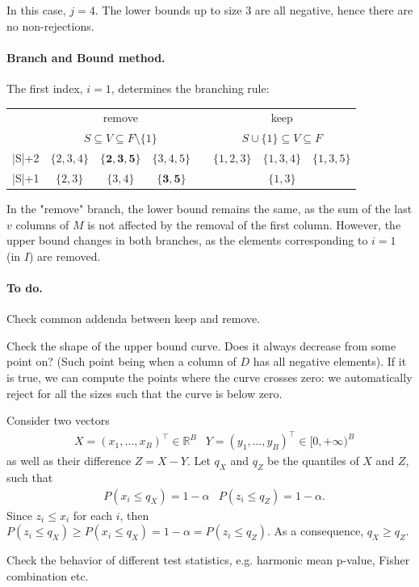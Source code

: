 \documentclass[11pt,a4paper,openright,twoside]{article}
\begin{document}
In this case, $j=4$. The lower bounds up to size 3 are all negative, hence there are no non-rejections. 



\newpage
\paragraph{Branch and Bound method.} The first index, $i=1$, determines the branching rule:


\begin{table}[h!]
\centering
\begin{tabular}{c|ccccccc}
 & \multicolumn{3}{c}{remove} & & \multicolumn{3}{c}{keep}\\
 & \multicolumn{3}{c}{$S\subseteq V\subseteq F\setminus\{1\}$} & & \multicolumn{3}{c}{$S\cup\{1\}\subseteq V\subseteq F$}\\
\cline{2-4} \cline{6-8}
|S|+2 & $\{2,3,4\}$ & $\mathbf{\{2,3,5\}}$ & $\{3,4,5\}$ & & $\{1,2,3\}$ & $\{1,3,4\}$ & $\{1,3,5\}$ \\
|S|+1 & $\{2,3\}$ & $\{3,4\}$ & $\mathbf{\{3,5\}}$ & & & $\{1,3\}$ &  \\
\end{tabular}
\end{table}

In the "remove" branch, the lower bound remains the same, as the sum of the last $v$ columns of $M$ is not affected by the removal of the first column. However, the upper bound changes in both branches, as the elements corresponding to $i=1$ (in $I$) are removed.



\vspace{5mm}
\paragraph{To do.} Check common addenda between keep and remove.

\vspace{3mm}
Check the shape of the upper bound curve. Does it always decrease from some point on? (Such point being when a column of $D$ has all negative elements). If it is true, we can compute the points where the curve crosses zero: we automatically reject for all the sizes such that the curve is below zero.

Consider two vectors
\begin{align*}
&X=(x_1,\ldots,x_B)^\top\in\mathbb{R}^B  & Y=(y_1,\ldots,y_B)^\top\in[0,+\infty)^B
\end{align*}
as well as their difference $Z=X-Y$. Let $q_X$ and $q_Z$ be the quantiles of $X$ and $Z$, such that
\begin{align*}
&P(x_i\leq q_X)=1-\alpha  & P(z_i\leq q_Z)=1-\alpha .
\end{align*}
Since $z_i\leq x_i$ for each $i$, then $P(z_i\leq q_X)\geq P(x_i\leq q_X)=1-\alpha=P(z_i\leq q_Z)$. As a consequence, $q_X\geq q_Z$.

\vspace{3mm}
Check the behavior of different test statistics, e.g. harmonic mean p-value, Fisher combination etc.
\end{document}
